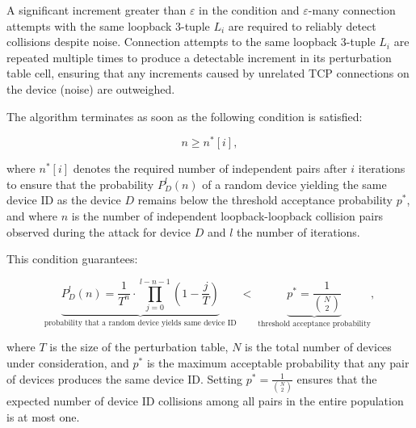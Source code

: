 \documentclass[twocolumn]{report}
\begin{document}
A significant increment greater than \(\varepsilon\) in the condition and \(\varepsilon\)-many connection attempts with the same loopback 3-tuple \(L_i\) are required to reliably detect collisions despite \alert{noise}. Connection attempts to the same loopback 3-tuple \(L_i\) are repeated \alert{multiple times} to produce a detectable increment in its perturbation table cell, ensuring that any increments caused by unrelated TCP connections on the device (noise) are outweighed.

The algorithm \alert{terminates} as soon as the following condition is satisfied:

\vspace{-0.2cm}
\begin{minipage}{\columnwidth}
	\[
		n \ge n^*[i],
	\]
\end{minipage}

where \( n^*[i] \) denotes the required \alert{number of independent pairs} after \( i \) \alert{iterations} to ensure that the \alert{probability} \( P^l_D(n) \) of a random device yielding the same device ID as the device \( D \) remains below the \alert{threshold acceptance probability} \( p^* \), and where \( n \) is the \alert{number of independent loopback-loopback collision pairs} observed during the attack for device \( D \) and \( l \) the \alert{number of iterations}.

This condition guarantees:
\vspace{-1cm}
\begin{center}
    \begin{adjustbox}{max width=\columnwidth}
        \begin{minipage}[t]{0.5\textwidth}
            \[
                \underbrace{
                P_D^l(n)
                =
                \frac{1}{T^n}
                \cdot
                \prod_{j=0}^{l - n - 1}
                \left(1 - \frac{j}{T}\right)
                }_{\text{probability that a random device yields same device ID}}
                \;<\;
                \underbrace{
                p^* = \frac{1}{\binom{N}{2}}
                }_{\text{threshold acceptance probability}},
            \]
        \end{minipage}
    \end{adjustbox}
\end{center}

where \( T \) is the \alert{size of the perturbation table}, \( N \) is the \alert{total number of devices} under consideration, and \( p^* \) is the \alert{maximum acceptable probability} that any \alert{pair} of devices produces the same device ID. Setting \( p^* = \frac{1}{\binom{N}{2}} \) ensures that the expected number of device ID collisions among all pairs in the entire population is \alert{at most one}.
\end{document}

